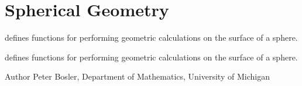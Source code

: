 \hypertarget{group___sphere_geom}{\section{Spherical Geometry}
\label{group___sphere_geom}
}


defines functions for performing geometric calculations on the surface of a sphere.  


defines functions for performing geometric calculations on the surface of a sphere. 

\begin{DoxyAuthor}{Author}
Peter Bosler, Department of Mathematics, University of Michigan 
\end{DoxyAuthor}
